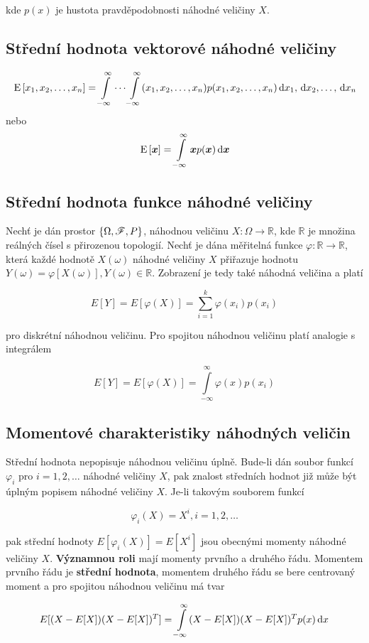 kde $p(x)$ je hustota pravděpodobnosti náhodné veličiny $X$.

\subsection{Střední hodnota vektorové náhodné veličiny}

\[ \mean{\vecrow[x]}=\int\limits_{-\infty}^\infty\cdots\int\limits_{-\infty}^\infty(\vecrow[x])p(\vecrow[x])\vecrow[\d x] \]
nebo
\[\mean{\vec{x}}=\int\limits_{-\infty}^\infty \vec{x}p(\vec{x})\d\vec{x}  \]

\subsection{Střední hodnota funkce náhodné veličiny}
Nechť je dán prostor $\brs{\Omega, \mathscr{F}, P}$, náhodnou veličinu $X:\Omega\to\mathbb{R}$, kde $\mathbb{R}$ je množina reálných čísel s přirozenou topologií. Nechť je dána měřitelná funkce $\varphi:\mathbb{R}\to\mathbb{R}$, která každé hodnotě $X(\omega)$ náhodné veličiny $X$ přiřazuje hodnotu $Y(\omega)=\varphi[X(\omega)],Y(\omega)\in\mathbb{R}$. Zobrazení je tedy také náhodná veličina a platí

\[ E[Y] = E[\varphi(X)]=\sum_{i=1}^k \varphi(x_i)p(x_i) \]

pro diskrétní náhodnou veličinu. Pro spojitou náhodnou veličinu platí analogie s integrálem

\[ E[Y] = E[\varphi(X)]=\int\limits_{-\infty}^\infty \varphi(x)p(x_i) \]

\subsection{Momentové charakteristiky náhodných veličin}
Střední hodnota nepopisuje náhodnou veličinu úplně. Bude-li dán soubor funkcí $\varphi_i$ pro $i=1,2,\ldots$ náhodné veličiny $X$, pak znalost středních hodnot již může být úplným popisem náhodné veličiny $X$. Je-li takovým souborem funkcí 

\[ \varphi_i(X) = X^i, i=1,2,\ldots \]

pak střední hodnoty $E[\varphi_i(X)]=E[X^i]$ jsou obecnými momenty náhodné veličiny $X$. \textbf{Významnou roli} mají momenty prvního a druhého řádu. Momentem prvního řádu je \textbf{střední hodnota}, momentem druhého řádu se bere centrovaný moment a pro spojitou náhodnou veličinu má tvar

\[ E[(X-E[X])(X-E[X])^T] = \int\limits_{-\infty}^\infty (X-E[X])(X-E[X])^T p(x)\d x \]

